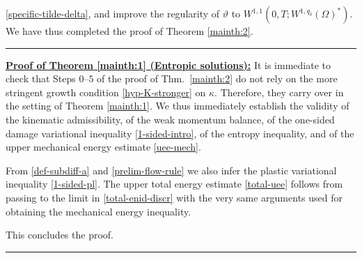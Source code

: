 \documentclass[a4paper,10pt,reqno]{amsart}
\numberwithin{equation}{section}
\numberwithin{equation}{section}
\newcommand{\teta}{\vartheta}
\newcommand{\QED}{\mbox{}\hfill\rule{5pt}{5pt}\medskip\par}
\newcommand{\condu}{\kappa}
\newcommand{\EEE}{\color{black}}
\begin{document}
\eqref{specific-tilde-delta}, and improve the regularity of $\teta$ to $W^{1,1}(0,T;W^{1,q_{\tilde \delta}}(\Omega)^*)$. 
We have thus completed the proof of Theorem \ref{mainth:2}. 
\QED
\par
\noindent 
\textbf{\underline{Proof of Theorem  \ref{mainth:1} (Entropic solutions):}} It is immediate to check that 
Steps $0$--$5$ of the proof of Thm.\    \ref{mainth:2} 
do not rely on the more stringent growth condition \eqref{hyp-K-stronger} on $\condu$. Therefore, they carry over
in the setting of  Theorem \ref{mainth:1}. We thus immediately establish the validity 
of the kinematic admissibility,
of the weak momentum balance,  of the one-sided damage variational inequality \eqref{1-sided-intro},  of the entropy inequality, and of the upper mechanical energy estimate \eqref{uee-mech}.
\par
From \eqref{def-subdiff-a} and \eqref{prelim-flow-rule} we also infer the plastic variational inequality \eqref{1-sided-pl}. The upper total energy estimate \eqref{total-uee} %
 follows from 
passing to the limit in \eqref{total-enid-discr} with the very same arguments used for obtaining  the mechanical energy inequality. 
\par
This concludes the proof.
\QED
\end{document}
